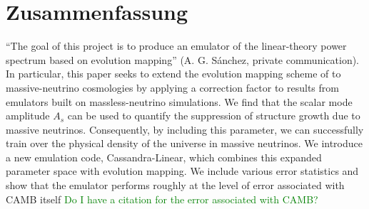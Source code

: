 

\chapter*{Zusammenfassung}

``The goal of this project is to produce an emulator of the linear-theory
power spectrum based on evolution mapping'' (A. G. S\'{a}nchez, private
communication). In particular, this paper seeks to extend the evolution
mapping scheme of  to massive-neutrino cosmologies by applying a
correction
factor to results from emulators built on massless-neutrino simulations. We
find that the scalar mode amplitude $A_s$ can be used to quantify the
suppression of structure growth due to massive neutrinos. Consequently, by
including this parameter, we can successfully train over the physical density
of the universe in massive neutrinos. We introduce a new emulation code,
Cassandra-Linear, which combines this expanded parameter space with evolution
mapping. We include various error statistics and show that the emulator
performs roughly at the level of error associated with CAMB itself
\textcolor{green}{Do I have a citation for the error associated with CAMB?}